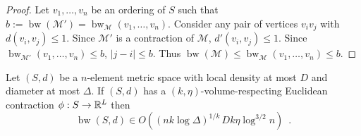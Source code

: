 \documentclass{patmorin}
\renewcommand{\ge}{\geqslant}
\renewcommand{\le}{\leqslant}
\DeclareMathOperator{\bw}{bw}
\begin{document}
\begin{proof}
  Let $v_1,\ldots,v_n$ be an ordering of $S$ such that $b:=\bw(\mathcal{M}')=\bw_{\mathcal{M}}(v_1,\ldots,v_n)$. Consider any pair of vertices $v_iv_j$ with $d(v_i,v_j) \le 1$. Since $\mathcal{M}'$ is a contraction of $\mathcal{M}$, $d'(v_i,v_j)\le 1$.  Since $\bw_{\mathcal{M}'}(v_1,\ldots,v_n)\le b$, $|j-i|\le b$.  Thus $\bw(\mathcal{M})\le \bw_{\mathcal{M}}(v_1,\ldots,v_n)\le b$.
\end{proof}




\begin{thm}\label{volume_density_bandwidth}
  Let $(S,d)$ be a $n$-element metric space with local density at most $D$ and diameter at most $\Delta$.  If $(S,d)$ has a $(k,\eta)$-volume-respecting Euclidean contraction $\phi:S\to\mathbb{R}^L$
  then
  \[
    \bw(S,d) \in O((nk\log\Delta)^{1/k}\,Dk\eta\log^{3/2} n) \enspace .
  \]
\end{thm}

\end{document}
